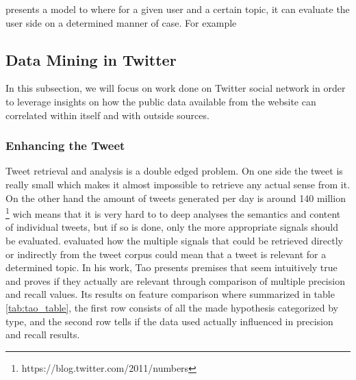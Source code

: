 \citet{Sudhof2011} presents a model to where for a given user and a certain topic, it can evaluate the user side on a determined manner of case. For example 

\subsection{Data Mining in Twitter } %
\label{sub:data_mining_in_twitter_}
In this subsection, we will focus on work done on Twitter social network in order to leverage insights on how the public data available from the website can correlated within itself and with outside sources. 

\subsubsection{Enhancing the Tweet} %
\label{ssub:the_tweet}
Tweet retrieval and analysis is a double edged problem. On one side the tweet is really small which makes it almost impossible to retrieve any actual sense from it. On the other hand the amount of tweets generated per day is around 140 million \footnote{https://blog.twitter.com/2011/numbers} wich means that it is very hard to to deep analyses the semantics and content of individual tweets, but if so is done, only the more appropriate signals should be evaluated.
\citet{Tao2012} evaluated how the multiple signals that could be retrieved directly or indirectly from the tweet corpus could mean that a tweet is relevant for a determined topic. In his work, Tao presents premises that seem intuitively true and proves if they actually are relevant through comparison of multiple precision and recall values. Its results on feature comparison where summarized in table \ref{tab:tao_table}, the first row consists of all the made hypothesis categorized by type, and the second row tells if the data used actually influenced in precision and recall results.

